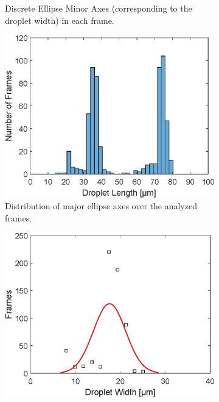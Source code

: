 \begin{figure}[h]
\begin{subfigure}[r]{0.49\textwidth}
		\caption{Discrete Ellipse Minor Axes (corresponding to the droplet width) in each frame.}
		\label{fig:tracking:width}
	\end{subfigure}
\vfil
	\begin{subfigure}[l]{0.49\textwidth} 
	\centering
	\includegraphics[clip,trim={0mm 0mm 0mm 0mm}, scale=.5]{Ressourcen/Tracking/HistogramLength}
	\caption{Distribution of major ellipse axes over the analyzed frames.}
	\label{fig:tracking:histLength}
\end{subfigure}
\hfill
\begin{subfigure}[r]{0.49\textwidth} 
	\centering
	\includegraphics[clip,trim={0mm 0mm 0mm 0mm},scale=.5]{Ressourcen/Tracking/HistogramWidth}

\end{subfigure}
\end{figure}
